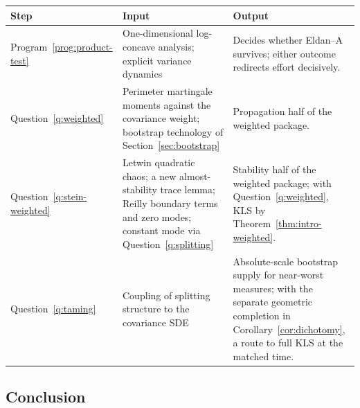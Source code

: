 \documentclass[../../main.tex]{subfiles}
\begin{document}
\begin{center}
\begin{tabularx}{\textwidth}{@{}>{\raggedright\arraybackslash}p{}>{\raggedright\arraybackslash}p{}Y@{}}
\toprule
Step & Input & Output \\
\midrule
Program~\ref{prog:product-test} & One-dimensional log-concave analysis; explicit variance
dynamics & Decides whether Eldan--A survives; either outcome redirects effort decisively. \\
\addlinespace
Question~\ref{q:weighted} & Perimeter martingale moments against the covariance weight;
bootstrap technology of Section~\ref{sec:bootstrap} & Propagation half of the weighted
package. \\
\addlinespace
Question~\ref{q:stein-weighted} & Letwin quadratic chaos; a new almost-stability trace lemma;
Reilly boundary terms and zero modes; constant mode via Question~\ref{q:splitting} & Stability half of the weighted package; with
Question~\ref{q:weighted}, KLS by Theorem~\ref{thm:intro-weighted}. \\
\addlinespace
Question~\ref{q:taming} & Coupling of splitting structure to the covariance SDE & Absolute-scale
bootstrap supply for near-worst measures; with the separate geometric completion in
Corollary~\ref{cor:dichotomy}, a route to full KLS at the matched time. \\
\bottomrule
\end{tabularx}
\end{center}

\subsection{Conclusion}
\end{document}
